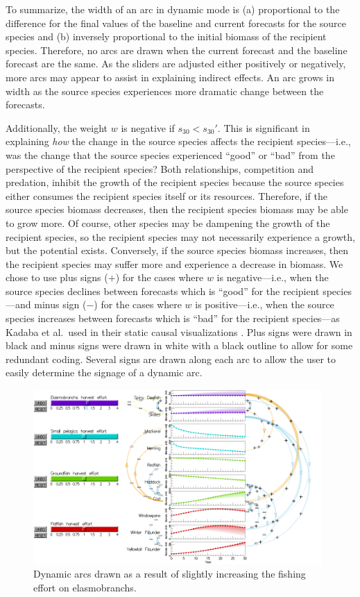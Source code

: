 To summarize, the width of an arc in dynamic mode is (a) proportional to the difference for the final values of the baseline and current forecasts for the source species and (b) inversely proportional to the initial biomass of the recipient species.  Therefore, no arcs are drawn when the current forecast and the baseline forecast are the same.  As the sliders are adjusted either positively or negatively, more arcs may appear to assist in explaining indirect effects.  An arc grows in width as the source species experiences more dramatic change between the forecasts.

Additionally, the weight $w$ is negative if $s_{30} < s_{30}'$.  This is significant in explaining \textit{how} the change in the source species affects the recipient species---i.e., was the change that the source species experienced ``good'' or ``bad'' from the perspective of the recipient species?  Both relationships, competition and predation, inhibit the growth of the recipient species because the source species either consumes the recipient species itself or its resources.  Therefore, if the source species biomass decreases, then the recipient species biomass may be able to grow more.  Of course, other species may be dampening the growth of the recipient species, so the recipient species may not necessarily experience a growth, but the potential exists.  Conversely, if the source species biomass increases, then the recipient species may suffer more and experience a decrease in biomass.  We chose to use plus signs ($+$) for the cases where $w$ is negative---i.e., when the source species declines between forecasts which is ``good'' for the recipient species---and minus sign ($-$) for the cases where $w$ is positive---i.e., when the source species increases between forecasts which is ``bad'' for the recipient species---as Kadaba et al.\ used in their static causal visualizations \cite{kadaba2007}.  Plus signs were drawn in black and minus signs were drawn in white with a black outline to allow for some redundant coding.  Several signs are drawn along each arc to allow the user to easily determine the signage of a dynamic arc.

\begin{figure}[h]
	\centering
	\includegraphics[width=0.98\textwidth]{figures/png/arcs_dynamic.png}
	\caption{Dynamic arcs drawn as a result of slightly increasing the fishing effort on elasmobranchs.}
	\label{fig:arcs_dynamic}
\end{figure}

